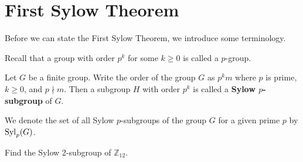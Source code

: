 \section{First Sylow Theorem}
Before we can state the First Sylow Theorem, we introduce some terminology.

Recall that a group with order $p^k$ for some $k \geq 0$ is called a $p$-group.

\begin{definition}\label{definition-sylow-p-subgroup}
    Let $G$ be a finite group. Write the order of the group $G$ as $p^k m$ where $p$ is prime, $k \geq 0$, and $p \nmid m$. Then a subgroup $H$ with order $p^k$ is called a \textbf{Sylow $p$-subgroup} of $G$.
\end{definition}
We denote the set of all Sylow $p$-subgroups of the group $G$ for a given prime $p$ by $\mathrm{Syl}_{p}(G)$.

\begin{exercise}
    Find the Sylow 2-subgroup of $\mathbb{Z}_{12}$.
\end{exercise}

\newpage

